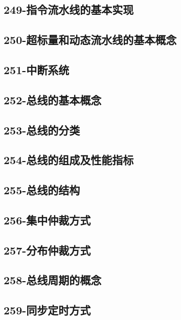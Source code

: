 \subsection{249-指令流水线的基本实现}

\subsection{250-超标量和动态流水线的基本概念}

\subsection{251-中断系统}

\subsection{252-总线的基本概念}

\subsection{253-总线的分类}

\subsection{254-总线的组成及性能指标}

\subsection{255-总线的结构}

\subsection{256-集中仲裁方式}

\subsection{257-分布仲裁方式}

\subsection{258-总线周期的概念}

\subsection{259-同步定时方式}

